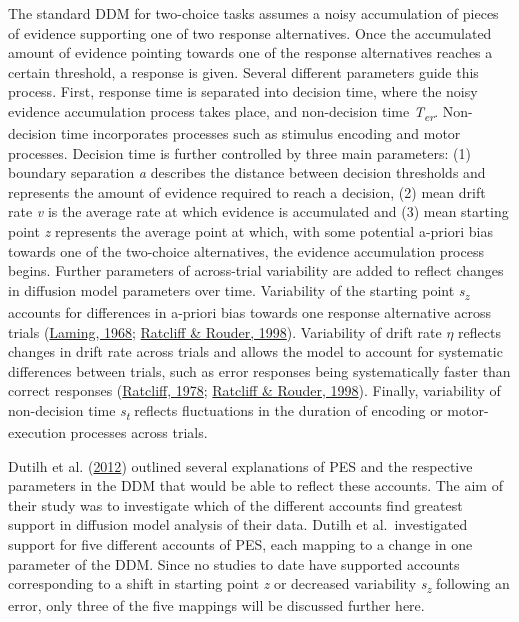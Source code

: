 \documentclass[
  man,floatsintext]{apa7}
\begin{document}
The standard DDM for two-choice tasks assumes a noisy accumulation of pieces of evidence supporting one of two response alternatives. Once the accumulated amount of evidence pointing towards one of the response alternatives reaches a certain threshold, a response is given. Several different parameters guide this process. First, response time is separated into decision time, where the noisy evidence accumulation process takes place, and non-decision time \emph{T\textsubscript{er}}. Non-decision time incorporates processes such as stimulus encoding and motor processes. Decision time is further controlled by three main parameters: (1) boundary separation \emph{a} describes the distance between decision thresholds and represents the amount of evidence required to reach a decision, (2) mean drift rate \emph{v} is the average rate at which evidence is accumulated and (3) mean starting point \emph{z} represents the average point at which, with some potential a-priori bias towards one of the two-choice alternatives, the evidence accumulation process begins. Further parameters of across-trial variability are added to reflect changes in diffusion model parameters over time. Variability of the starting point \emph{s\textsubscript{z}} accounts for differences in a-priori bias towards one response alternative across trials (\protect\hyperlink{ref-laming1968}{Laming, 1968}; \protect\hyperlink{ref-ratcliff1998}{Ratcliff \& Rouder, 1998}). Variability of drift rate \(\eta\) reflects changes in drift rate across trials and allows the model to account for systematic differences between trials, such as error responses being systematically faster than correct responses (\protect\hyperlink{ref-ratcliff1978}{Ratcliff, 1978}; \protect\hyperlink{ref-ratcliff1998}{Ratcliff \& Rouder, 1998}). Finally, variability of non-decision time \emph{s\textsubscript{t}} reflects fluctuations in the duration of encoding or motor-execution processes across trials.

Dutilh et al. (\protect\hyperlink{ref-dutilh2012testing}{2012}) outlined several explanations of PES and the respective parameters in the DDM that would be able to reflect these accounts. The aim of their study was to investigate which of the different accounts find greatest support in diffusion model analysis of their data. Dutilh et al.~investigated support for five different accounts of PES, each mapping to a change in one parameter of the DDM. Since no studies to date have supported accounts corresponding to a shift in starting point \emph{z} or decreased variability \emph{s\textsubscript{z}} following an error, only three of the five mappings will be discussed further here.
\end{document}

